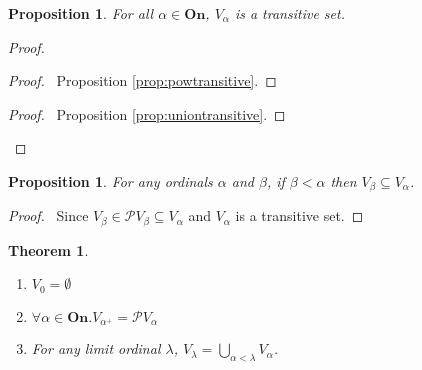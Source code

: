 \documentclass{book}
\let\qed\relax
\newtheorem{prop}[ax]{Proposition}
\newtheorem{thm}[ax]{Theorem}
\theoremstyle{definition}
\begin{document}
\begin{prop}
For all $\alpha \in \mathbf{On}$, $V_\alpha$ is a transitive set.
\end{prop}

\begin{proof}
\pf
{}
\begin{proof}
	\pf\ Proposition \ref{prop:powtransitive}.
\end{proof}
\begin{proof}
	\pf\ Proposition \ref{prop:uniontransitive}.
\end{proof}
\qed
\end{proof}

\begin{prop}
\label{prop:Vmono}
For any ordinals $\alpha$ and $\beta$, if $\beta < \alpha$ then $V_\beta \subseteq V_\alpha$.
\end{prop}

\begin{proof}
\pf\ Since $V_\beta \in \mathcal{P} V_\beta \subseteq V_\alpha$ and $V_\alpha$ is a transitive set. \qed
\end{proof}

\begin{thm}$ $
\begin{enumerate}
\item $V_0 = \emptyset$
\item $\forall \alpha \in \mathbf{On}. V_{\alpha^+} = \mathcal{P} V_\alpha$
\item For any limit ordinal $\lambda$, $V_\lambda = \bigcup_{\alpha < \lambda} V_\alpha$.
\end{enumerate}
\end{thm}
\end{document}
